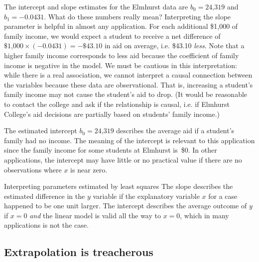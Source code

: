 \begin{examplewrap}
\begin{nexample}{The intercept and slope estimates for
    the Elmhurst data are $b_0 = \text{24,319}$
    and $b_1 = -0.0431$.
    What do these numbers really mean?}
  Interpreting the slope parameter is helpful in almost any
  application.
  For each additional \$1,000 of family income, we would expect
  a student to receive a net difference of
  $\$\text{1,000}\times (-0.0431) = -\$43.10$ in aid on average,
  i.e. \$43.10 \emph{less}.
  Note that a higher family income corresponds to less aid
  because the coefficient of family income is negative in
  the model.
  We must be cautious in this interpretation:
  while there is a real association, we cannot interpret
  a causal connection between the variables because these
  data are observational.
  That is, increasing a student's family income may not
  cause the student's aid to drop.
  (It would be reasonable to contact the college and ask
  if the relationship is causal,
  i.e. if Elmhurst College's aid decisions are partially
  based on students' family income.)

  The estimated intercept $b_0 = \text{24,319}$
  describes the average aid if a student's family had no income.
  The meaning of the intercept is relevant to this application
  since the family income for some students at Elmhurst is~\$0.
  In other applications, the intercept may have little
  or no practical value if there are no observations where
  $x$ is near zero.
\end{nexample}
\end{examplewrap}

\begin{onebox}{Interpreting parameters estimated by least squares}
  The slope describes the estimated difference in the
  $y$ variable if the explanatory variable $x$ for a case
  happened to be one unit larger.
  The intercept describes the average outcome of $y$ if $x=0$
  \emph{and} the linear model is valid all the way to $x=0$,
  which in many applications is not the case.
\end{onebox}



\subsection{Extrapolation is treacherous}


